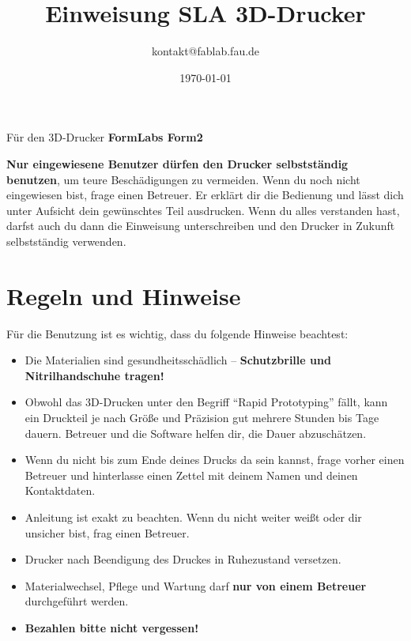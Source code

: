 \documentclass{\basedir/fablab-document}
\date{\today}
\author{kontakt@fablab.fau.de}
\title{Einweisung SLA 3D-Drucker}
\begin{document}
	
	\maketitle
	\begin{center}
		Für den 3D-Drucker \textbf{FormLabs Form2}
	\end{center}
	
	\textbf{Nur eingewiesene Benutzer dürfen den Drucker selbstständig benutzen}, um teure Beschädigungen zu vermeiden. Wenn du noch nicht eingewiesen bist, frage einen Betreuer. Er erklärt dir die Bedienung und lässt dich unter Aufsicht dein gewünschtes Teil ausdrucken. Wenn du alles verstanden hast, darfst auch du dann die Einweisung unterschreiben und den Drucker in Zukunft selbstständig verwenden.
	
	\section{Regeln und Hinweise}
	Für die Benutzung ist es wichtig, dass du folgende Hinweise beachtest:
	
	\begin{itemize}
		\item Die Materialien sind gesundheitsschädlich -- \textbf{Schutzbrille und Nitrilhandschuhe tragen!}
		\item Obwohl das 3D-Drucken unter den Begriff ``Rapid Prototyping'' fällt, kann ein Druckteil je nach Größe und
		Präzision gut mehrere Stunden bis Tage dauern. Betreuer und die Software helfen dir, die Dauer abzuschätzen.
		\item Wenn du nicht bis zum Ende deines Drucks da sein kannst, frage vorher einen Betreuer und hinterlasse einen Zettel mit deinem Namen und deinen Kontaktdaten.
		\item Anleitung ist exakt zu beachten. Wenn du nicht weiter weißt oder dir unsicher bist, frag einen Betreuer.
		\item Drucker nach Beendigung des Druckes in Ruhezustand versetzen.
		\item Materialwechsel, Pflege und Wartung darf \textbf{nur von einem Betreuer} durchgeführt werden.
		\item \textbf{Bezahlen bitte nicht vergessen!}
	\end{itemize}
\end{document}
